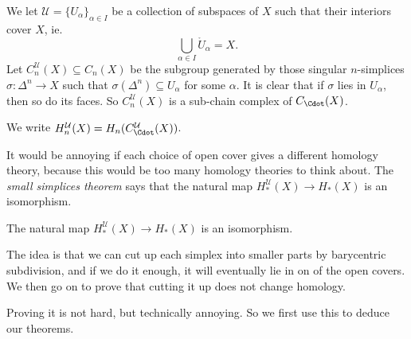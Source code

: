 \documentclass[a4paper]{article}
\begin{document}
\begin{defi}
  We let $\mathcal{U} = \{U_\alpha\}_{\alpha \in I}$ be a collection of subspaces of $X$ such that their interiors cover $X$, ie.
  \[
    \bigcup_{\alpha \in I} \mathring{U}_\alpha = X.
  \]
  Let $C_n^\mathcal{U}(X) \subseteq C_n(X)$ be the subgroup generated by those singular $n$-simplices $\sigma: \Delta^n \to X$ such that $\sigma(\Delta^n) \subseteq U_\alpha$ for some $\alpha$. It is clear that if $\sigma$ lies in $U_\alpha$, then so do its faces. So $C_n^{\mathcal{U}}(X)$ is a sub-chain complex of $C_\Cdot(X)$.

  We write $H_n^\mathcal{U}(X) = H_n(C_\Cdot^\mathcal{U}(X))$.
\end{defi}
It would be annoying if each choice of open cover gives a different homology theory, because this would be too many homology theories to think about. The \emph{small simplices theorem} says that the natural map $H_*^\mathcal{U}(X) \to H_*(X)$ is an isomorphism.

\begin{thm}
  The natural map $H_*^\mathcal{U}(X) \to H_*(X)$ is an isomorphism.
\end{thm}

The idea is that we can cut up each simplex into smaller parts by barycentric subdivision, and if we do it enough, it will eventually lie in on of the open covers. We then go on to prove that cutting it up does not change homology.

Proving it is not hard, but technically annoying. So we first use this to deduce our theorems.
\end{document}
